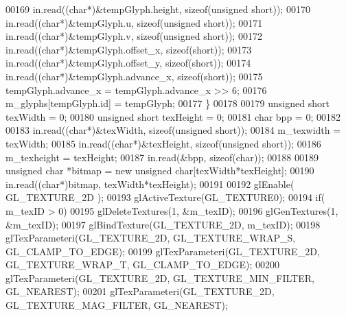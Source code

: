 \begin{DoxyCode}
00169         in.read((\textcolor{keywordtype}{char}*)&tempGlyph.height, \textcolor{keyword}{sizeof}(\textcolor{keywordtype}{unsigned} \textcolor{keywordtype}{short}));
00170         in.read((\textcolor{keywordtype}{char}*)&tempGlyph.u, \textcolor{keyword}{sizeof}(\textcolor{keywordtype}{unsigned} \textcolor{keywordtype}{short}));
00171         in.read((\textcolor{keywordtype}{char}*)&tempGlyph.v, \textcolor{keyword}{sizeof}(\textcolor{keywordtype}{unsigned} \textcolor{keywordtype}{short}));
00172         in.read((\textcolor{keywordtype}{char}*)&tempGlyph.offset_x, \textcolor{keyword}{sizeof}(\textcolor{keywordtype}{short}));
00173         in.read((\textcolor{keywordtype}{char}*)&tempGlyph.offset_y, \textcolor{keyword}{sizeof}(\textcolor{keywordtype}{short}));
00174         in.read((\textcolor{keywordtype}{char}*)&tempGlyph.advance_x, \textcolor{keyword}{sizeof}(\textcolor{keywordtype}{short}));
00175         tempGlyph.advance_x = tempGlyph.advance_x >> 6;
00176         m_glyphs[tempGlyph.id] = tempGlyph;
00177     \}
00178 
00179     \textcolor{keywordtype}{unsigned} \textcolor{keywordtype}{short} texWidth = 0;
00180     \textcolor{keywordtype}{unsigned} \textcolor{keywordtype}{short} texHeight = 0;
00181     \textcolor{keywordtype}{char} bpp = 0;
00182 
00183     in.read((\textcolor{keywordtype}{char}*)&texWidth, \textcolor{keyword}{sizeof}(\textcolor{keywordtype}{unsigned} \textcolor{keywordtype}{short}));
00184     m_texwidth = texWidth;
00185     in.read((\textcolor{keywordtype}{char}*)&texHeight, \textcolor{keyword}{sizeof}(\textcolor{keywordtype}{unsigned} \textcolor{keywordtype}{short}));
00186     m_texheight = texHeight;
00187     in.read(&bpp, \textcolor{keyword}{sizeof}(\textcolor{keywordtype}{char}));
00188 
00189     \textcolor{keywordtype}{unsigned} \textcolor{keywordtype}{char} *bitmap = \textcolor{keyword}{new} \textcolor{keywordtype}{unsigned} \textcolor{keywordtype}{char}[texWidth*texHeight];
00190     in.read((\textcolor{keywordtype}{char}*)bitmap, texWidth*texHeight);
00191 
00192     glEnable( GL_TEXTURE_2D );
00193     glActiveTexture(GL_TEXTURE0);
00194     \textcolor{keywordflow}{if}( m_texID > 0)
00195         glDeleteTextures(1, &m_texID);
00196     glGenTextures(1, &m_texID);
00197     glBindTexture(GL_TEXTURE_2D, m_texID);
00198     glTexParameteri(GL_TEXTURE_2D, GL_TEXTURE_WRAP_S, GL_CLAMP_TO_EDGE);
00199     glTexParameteri(GL_TEXTURE_2D, GL_TEXTURE_WRAP_T, GL_CLAMP_TO_EDGE);
00200     glTexParameteri(GL_TEXTURE_2D, GL_TEXTURE_MIN_FILTER, GL_NEAREST);
00201     glTexParameteri(GL_TEXTURE_2D, GL_TEXTURE_MAG_FILTER, GL_NEAREST);

\end{DoxyCode}
